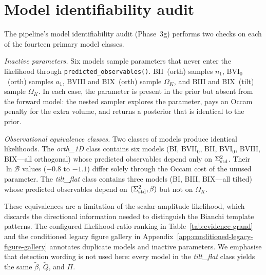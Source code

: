 \section{Model identifiability audit}
\label{sec:dup-audit}

The pipeline's model identifiability audit (Phase~3g) performs
two checks on each of the fourteen primary model classes.

\emph{Inactive parameters.}\quad
Six models sample parameters that never enter the likelihood
through \texttt{predicted\_observables()}.  BII~(orth) samples
$n_1$, BVI$_0$~(orth) samples $a_1$, BVIII and BIX~(orth)
sample $\Omega_K$, and BIII and BIX~(tilt) sample $\Omega_K$.
In each case, the parameter is present in the prior but
absent from the forward model: the nested sampler explores
the parameter, pays an Occam penalty for the extra volume, and
returns a posterior that is identical to the prior.

\emph{Observational equivalence classes.}\quad
Two classes of models produce identical likelihoods.  The
\emph{orth\_1D} class contains six models
(BI, BVII$_0$, BII, BVI$_0$, BVIII, BIX---all orthogonal)
whose predicted observables depend only on $\Sigma^2_{\mathrm{std}}$.  Their
$\ln\mathcal{B}$ values ($-0.8$ to $-1.1$) differ solely
through the Occam cost of the unused parameter.  The
\emph{tilt\_flat} class contains three models
(BI, BIII, BIX---all tilted) whose predicted observables
depend on $(\Sigma^2_{\mathrm{std}}, \beta)$ but not on $\Omega_K$.

These equivalences are a limitation of the scalar-amplitude
likelihood, which discards the directional information needed
to distinguish the Bianchi template patterns.  The configured
likelihood-ratio ranking in Table~\ref{tab:evidence-grand} and
the conditioned legacy figure gallery in Appendix~\ref{app:conditioned-legacy-figure-gallery} annotates duplicate models
and inactive parameters.  We emphasise that detection wording
is not used here: every model in the \emph{tilt\_flat} class
yields the same $\tilde{\beta}$, $\tilde{Q}$, and $\Pi$.

